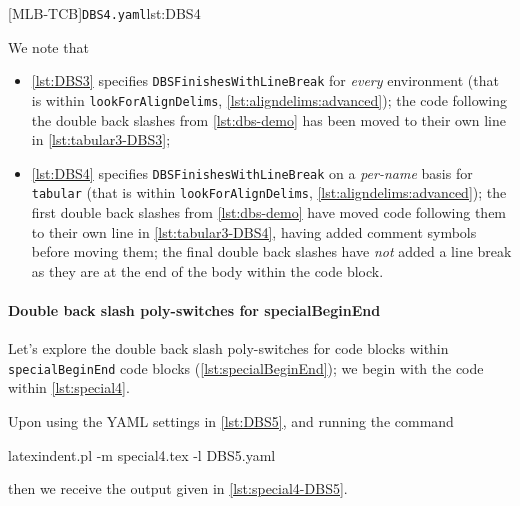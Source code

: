 		\begin{cmhtcbraster}[raster column skip=.01\linewidth]
			{\texttt{DBS4.yaml}}{lst:DBS4}
		\end{cmhtcbraster}

		We note that
		\begin{itemize}
			\item \cref{lst:DBS3} specifies \texttt{DBSFinishesWithLineBreak} for
			      \emph{every} environment (that is within \texttt{lookForAlignDelims},
			      \vref{lst:aligndelims:advanced});
			      the code following the double back slashes from \cref{lst:dbs-demo} has been moved to
			      their own line in \cref{lst:tabular3-DBS3};
			\item \cref{lst:DBS4} specifies \texttt{DBSFinishesWithLineBreak} on a
			      \emph{per-name} basis for \texttt{tabular} (that is within \texttt{lookForAlignDelims},
			      \vref{lst:aligndelims:advanced});
			      the first double back slashes from \cref{lst:dbs-demo} have moved code following them to
			      their own line in \cref{lst:tabular3-DBS4}, having added comment symbols before moving
			      them; the final double back slashes have \emph{not} added a line break as they are at the
			      end of the body within the code block.
		\end{itemize}

	\paragraph{Double back slash poly-switches for specialBeginEnd}
		Let's explore the double back slash poly-switches for code blocks within
		\texttt{specialBeginEnd} code blocks (\vref{lst:specialBeginEnd}); we begin with the code
		within \cref{lst:special4}.     


		Upon using the YAML settings in \cref{lst:DBS5}, and running the command
		 
		\begin{commandshell}
latexindent.pl -m special4.tex -l DBS5.yaml
\end{commandshell}
		then we receive the output given in \cref{lst:special4-DBS5}. 

